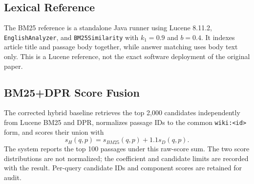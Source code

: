 \subsection{Lexical Reference}
The BM25 reference is a standalone Java runner using Lucene 8.11.2, \texttt{EnglishAnalyzer}, and \texttt{BM25Similarity} with $k_1=0.9$ and $b=0.4$. It indexes article title and passage body together, while answer matching uses body text only. This is a Lucene reference, not the exact software deployment of the original paper.

\subsection{BM25+DPR Score Fusion}\label{sec:hybrid}
The corrected hybrid baseline retrieves the top 2,000 candidates independently from Lucene BM25 and DPR, normalizes passage IDs to the common \texttt{wiki:<id>} form, and scores their union with
\begin{equation}
s_H(q,p)=s_{BM25}(q,p)+1.1s_D(q,p).
\end{equation}
The system reports the top 100 passages under this raw-score sum. The two score distributions are not normalized; the coefficient and candidate limits are recorded with the result. Per-query candidate IDs and component scores are retained for audit.
